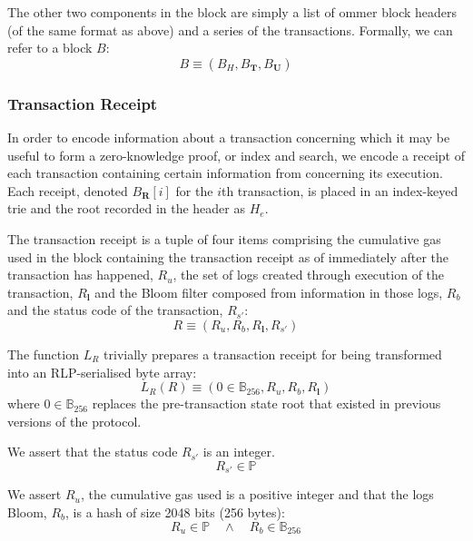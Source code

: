 \documentclass[9pt,oneside]{amsart}
\begin{document}
\begin{multicols}{2}
The other two components in the block are simply a list of ommer block headers (of the same format as above) and a series of the transactions. Formally, we can refer to a block $B$:
\begin{equation}
B \equiv (B_H, B_\mathbf{T}, B_\mathbf{U})
\end{equation}

\subsubsection{Transaction Receipt}

In order to encode information about a transaction concerning which it may be useful to form a zero-knowledge proof, or index and search, we encode a receipt of each transaction containing certain information from concerning its execution.
Each receipt, denoted $B_\mathbf{R}[i]$ for the $i$th transaction, is placed in an index-keyed trie and the root recorded in the header as $H_e$.

The transaction receipt is a tuple of four items comprising the cumulative gas used in the block containing the transaction receipt as of immediately after the transaction has happened, $R_u$, the set of logs created through execution of the transaction, $R_\mathbf{l}$ and the Bloom filter composed from information in those logs, $R_b$ and the status code of the transaction, $R_{s'}$:
\begin{equation}
R \equiv (R_u, R_b, R_\mathbf{l}, R_{s'})
\end{equation}

The function $L_R$ trivially prepares a transaction receipt for being transformed into an RLP-serialised byte array:
\begin{equation}
L_R(R) \equiv (0 \in \mathbb{B}_{256}, R_u, R_b, R_\mathbf{l})
\end{equation}
where $0 \in \mathbb{B}_{256}$ replaces the pre-transaction state root that existed in previous versions of the protocol.

We assert that the status code $R_{s'}$ is an integer.
\begin{equation}
R_{s'} \in \mathbb{P}
\end{equation}

We assert $R_u$, the cumulative gas used is a positive integer and that the logs Bloom, $R_b$, is a hash of size 2048 bits (256 bytes):
\begin{equation}
R_u \in \mathbb{P} \quad \wedge \quad R_b \in \mathbb{B}_{256}
\end{equation}


\end{multicols}
\end{document}
